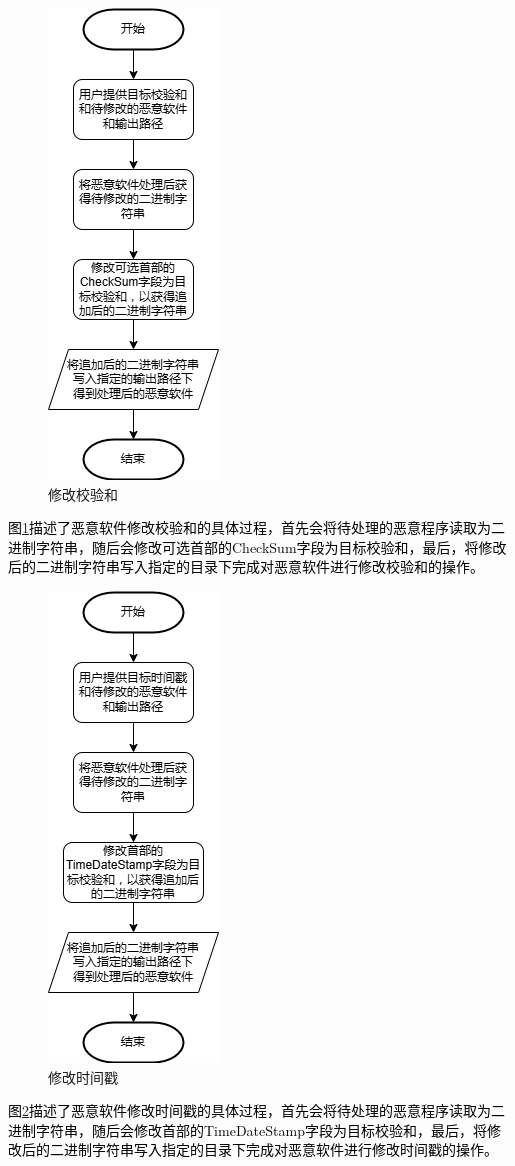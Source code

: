 \begin{figure}[htbp]
  \centering
  \includegraphics[]{images/modify_checksum.png}
  \caption{修改校验和}\label{fig:modify_checksum}
\end{figure}
\textcolor{black}{图\ref{fig:modify_checksum}描述了恶意软件修改校验和的具体过程，首先会将待处理的恶意程序读取为二进制字符串，随后会修改可选首部的CheckSum字段为目标校验和，最后，将修改后的二进制字符串写入指定的目录下完成对恶意软件进行修改校验和的操作。}

\begin{figure}[htbp]
  \centering
  \includegraphics[]{images/modify_timestamp.png}
  \caption{修改时间戳}\label{fig:modify_timestamp}
\end{figure}
\textcolor{black}{图\ref{fig:modify_timestamp}描述了恶意软件修改时间戳的具体过程，首先会将待处理的恶意程序读取为二进制字符串，随后会修改首部的TimeDateStamp字段为目标校验和，最后，将修改后的二进制字符串写入指定的目录下完成对恶意软件进行修改时间戳的操作。}

